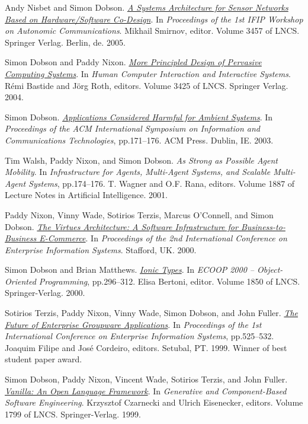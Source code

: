 \documentclass[11pt]{article}
\begin{document}
\label{org7cead0e}Andy Nisbet and Simon Dobson.  \emph{\href{https://simondobson.org/softcopy/WAC-04b.pdf}{A Systems Architecture for Sensor Networks Based on Hardware/Software Co-Design}}. In \emph{Proceedings of the 1st IFIP Workshop on Autonomic Communications}. Mikhail Smirnov, editor. Volume 3457 of LNCS. Springer Verlag. Berlin, de. 2005.

\label{orgdaa793d}Simon Dobson and Paddy Nixon.  \emph{\href{https://simondobson.org/softcopy/EHCI-04.pdf}{More Principled Design of Pervasive Computing Systems}}. In \emph{Human Computer Interaction and Interactive Systems}. Rémi Bastide and Jörg Roth, editors. Volume 3425 of LNCS. Springer Verlag. 2004.

\label{org94a3eb1}Simon Dobson.  \emph{\href{https://simondobson.org/softcopy/ISICT-2003.pdf}{Applications Considered Harmful for Ambient Systems}}. In \emph{Proceedings of the ACM International Symposium on Information and Communications Technologies}, pp.171–176. ACM Press. Dublin, IE. 2003.

\label{org2406eec}Tim Walsh, Paddy Nixon, and Simon Dobson.  \emph{As Strong as Possible Agent Mobility}. In \emph{Infrastructure for Agents, Multi-Agent Systems, and Scalable Multi-Agent Systems}, pp.174–176. T. Wagner and O.F. Rana, editors. Volume 1887 of Lecture Notes in Artificial Intelligence. 2001.

\label{org44fb459}Paddy Nixon, Vinny Wade, Sotirios Terzis, Marcus O’Connell, and Simon Dobson.  \emph{\href{https://simondobson.org/softcopy/TCD-CS-2000-08.pdf}{The Virtues Architecture: A Software Infrastructure for Business-to-Business E-Commerce}}. In \emph{Proceedings of the 2nd International Conference on Enterprise Information Systems}. Stafford, UK. 2000.

\label{orgd184169}Simon Dobson and Brian Matthews.  \emph{\href{https://simondobson.org/softcopy/ions-ecoop-2000.ps}{Ionic Types}}. In \emph{ECOOP 2000 – Object-Oriented Programming}, pp.296–312. Elisa Bertoni, editor. Volume 1850 of LNCS. Springer-Verlag. 2000.

\label{org6f45b8b}Sotirios Terzis, Paddy Nixon, Vinny Wade, Simon Dobson, and John Fuller.  \emph{\href{https://simondobson.org/softcopy/TCD-CS-1999-22.pdf}{The Future of Enterprise Groupware Applications}}. In \emph{Proceedings of the 1st International Conference on Enterprise Information Systems}, pp.525–532. Joaquim Filipe and José Cordeiro, editors. Setubal, PT. 1999. Winner of best student paper award.

\label{org3a959ac}Simon Dobson, Paddy Nixon, Vincent Wade, Sotirios Terzis, and John Fuller.  \emph{\href{https://simondobson.org/softcopy/vanilla-gcse-1999.ps}{Vanilla: An Open Language Framework}}. In \emph{Generative and Component-Based Software Engineering}. Krzysztof Czarnecki and Ulrich Eisenecker, editors. Volume 1799 of LNCS. Springer-Verlag. 1999.
\end{document}
